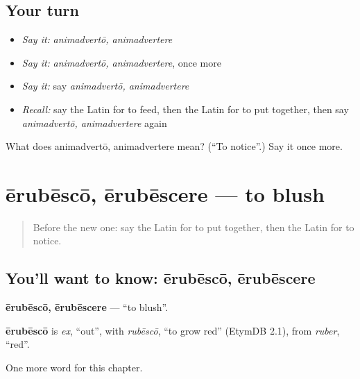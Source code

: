 \subsection*{Your turn}
\begin{itemize}
\raggedright
  \item \emph{Say it:} \emph{animadvertō, animadvertere}
  \item \emph{Say it:} \emph{animadvertō, animadvertere}, once more
  \item \emph{Say it:} say \emph{animadvertō, animadvertere}
  \item \emph{Recall:} say the Latin for to feed, then the Latin for to put together, then say \emph{animadvertō, animadvertere} again
\end{itemize}

\begin{tcolorbox}[breakable,colback=teal!4,colframe=teal!35!black,title={Before you move on}]
What does animadvertō, animadvertere mean? (\textquotedblleft{}To notice\textquotedblright{}.) Say it once more.
\end{tcolorbox}
\section[ērubēscō, ērubēscere]{ērubēscō, ērubēscere — to blush}

\label{lesson:LA-C260-erubesco}



\begin{quote}
Before the new one: say the Latin for to put together, then the Latin for to notice.
\end{quote}

\subsection*{You'll want to know: ērubēscō, ērubēscere}
\textbf{ērubēscō, ērubēscere} — \textquotedblleft{}to blush\textquotedblright{}.

\begin{cousinweb}
\textbf{ērubēscō} is \emph{ex}, \textquotedblleft{}out\textquotedblright{}, with \emph{rubēscō}, \textquotedblleft{}to grow red\textquotedblright{} (EtymDB 2.1), from \emph{ruber}, \textquotedblleft{}red\textquotedblright{}.
\end{cousinweb}

\begin{grammarlens}[title={What you've built}]
One more word for this chapter.
\end{grammarlens}

